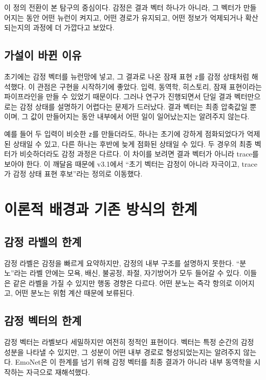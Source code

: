 \documentclass[11pt,a4paper]{article}
\newcommand{\eng}[1]{\texttt{#1}}
\begin{document}
이 정의 전환이 본 탐구의 중심이다. 감정은 결과 벡터 하나가 아니라, 그 벡터가 만들어지는 동안 어떤 뉴런이 켜지고, 어떤 경로가 유지되고, 어떤 정보가 억제되거나 확산되는지의 과정에 더 가깝다고 보았다.

\subsection{가설이 바뀐 이유}

초기에는 감정 벡터를 뉴런망에 넣고, 그 결과로 나온 잠재 표현 \eng{z}를 감정 상태처럼 해석했다. 이 관점은 구현을 시작하기에 좋았다. 입력, 동역학, 히스토리, 잠재 표현이라는 파이프라인을 만들 수 있었기 때문이다. 그러나 연구가 진행되면서 단일 결과 벡터만으로는 감정 상태를 설명하기 어렵다는 문제가 드러났다. 결과 벡터는 최종 압축값일 뿐이며, 그 값이 만들어지는 동안 내부에서 어떤 일이 일어났는지는 알려주지 않는다.

예를 들어 두 입력이 비슷한 \eng{z}를 만들더라도, 하나는 초기에 강하게 점화되었다가 억제된 상태일 수 있고, 다른 하나는 후반에 늦게 점화된 상태일 수 있다. 두 경우의 최종 벡터가 비슷하더라도 감정 과정은 다르다. 이 차이를 보려면 결과 벡터가 아니라 trace를 보아야 한다. 이 깨달음 때문에 v3.1에서 ``초기 벡터는 감정이 아니라 자극이고, trace가 감정 상태 표현 후보''라는 정의로 이동했다.

\section{이론적 배경과 기존 방식의 한계}

\subsection{감정 라벨의 한계}

감정 라벨은 감정을 빠르게 요약하지만, 감정의 내부 구조를 설명하지 못한다. ``분노''라는 라벨 안에는 모욕, 배신, 불공정, 좌절, 자기방어가 모두 들어갈 수 있다. 이들은 같은 라벨을 가질 수 있지만 행동 경향은 다르다. 어떤 분노는 즉각 항의로 이어지고, 어떤 분노는 위험 계산 때문에 보류된다.

\subsection{감정 벡터의 한계}

감정 벡터는 라벨보다 세밀하지만 여전히 정적인 표현이다. 벡터는 특정 순간의 감정 성분을 나타낼 수 있지만, 그 성분이 어떤 내부 경로로 형성되었는지는 알려주지 않는다. EmoNet은 이 한계를 넘기 위해 감정 벡터를 최종 결과가 아니라 내부 동역학을 시작하는 자극으로 재해석했다.
\end{document}
